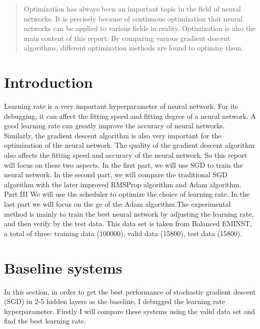 \documentclass{article}
\begin{document}
 


\begin{abstract} 

Optimization has always been an important topic in the field of neural networks. It is precisely because of continuous optimization that neural networks can be applied to various fields in reality. Optimization is also the main content of this report. By comparing various gradient descent algorithms, different optimization methods are found to optimize them.

\end{abstract} 

\section{Introduction}
\label{sec:intro}

Learning rate is a very important hyperparameter of neural network. For its debugging, it can affect the fitting speed and fitting degree of a neural network. A good learning rate can greatly improve the accuracy of neural networks. Similarly, the gradient descent algorithm is also very important for the optimization of the neural network. The quality of the gradient descent algorithm also affects the fitting speed and accuracy of the neural network. So this report will focus on these two aspects. In the first part, we will use SGD to train the neural network. In the second part, we will compare the traditional SGD algorithm with the later improved RMSProp algorithm and Adam algorithm. Part III We will use the scheduler to optimize the choice of learning rate. In the last part we will focus on the ge of the Adam algorithm.The experimental method is mainly to train the best neural network by adjusting the learning rate, and then verify by the test data. This data set is taken from Balanced EMINST, a total of three: training data (100000), valid data (15800), test data (15800).


\section{Baseline systems} 

In this section, in order to get the best performance of stochastic gradient descent (SGD) in 2-5 hidden layers as the baseline, I debugged the learning rate hyperparameter. Firstly I will compare these systems using the valid data set and find the best learning rate.
\end{document}
